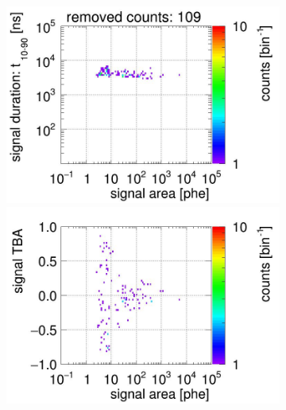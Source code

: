 \begin{landscape}
\begin{figure}[!p]
\begin{subfigure}[t]{0.32\textwidth}
		\includegraphics[width=\figurewidth,clip,trim={0 98 0 15}]{Figures/GasTest/CutsValid/res64767/pdpaX13Vecfig64767.jpg}
		\includegraphics[width=\figurewidth,clip,trim={0 8 0 40}]{Figures/GasTest/CutsValid/res64767/tbapaX13Vecfig64767.jpg}
		\caption{}
		\label{fig:signal selection 13}
	\end{subfigure}
	\begin{subfigure}[t]{0.32\textwidth}
		\centering

\end{subfigure}
\end{figure}
\end{landscape}
